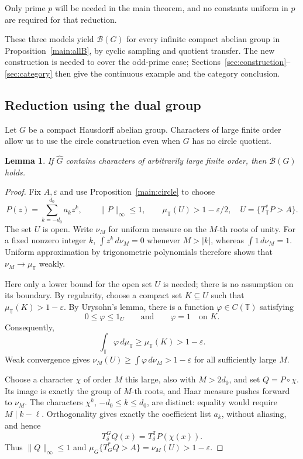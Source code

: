 \documentclass[11pt]{amsart}
\newtheorem{lemma}[theorem]{Lemma}
\theoremstyle{definition}
\theoremstyle{remark}
\newcommand{\B}{\mathcal B}
\begin{document}
Only prime \(p\) will be needed in the main theorem, and no
constants uniform in \(p\) are required for that reduction.

These three models yield \(\B(G)\) for every infinite compact
abelian group in Proposition~\ref{main:allB}, by cyclic sampling
and quotient transfer. The new construction is needed to cover the
odd-prime case; Sections~\ref{sec:construction}--\ref{sec:category} then give the continuous example
and the category conclusion.

\subsection{Reduction using the dual group}

Let $G$ be a compact Hausdorff abelian group. Characters of large finite order allow us to use the circle construction
even when \(G\) has no circle quotient.

\begin{lemma}\label{main:sampling}
If \(\widehat G\) contains characters of arbitrarily large finite
order, then \(\B(G)\) holds.
\end{lemma}

\begin{proof}
Fix \(A,\varepsilon\) and use Proposition~\ref{main:circle} to choose
\[
 P(z)=\sum_{k=-d_0}^{d_0} a_kz^k,\qquad \|P\|_\infty\leq1,\qquad
 \mu_{\mathbb T}(U)>1-\varepsilon/2,\quad U=\{T^*_{\mathbb T}P>A\}.
\]
The set \(U\) is open. Write \(\nu_M\) for uniform measure on
the \(M\)-th roots of unity. For a fixed nonzero integer \(k\),
\(\int z^k\,d\nu_M=0\) whenever \(M>|k|\), whereas
\(\int1\,d\nu_M=1\). Uniform approximation by trigonometric
polynomials therefore shows that \(\nu_M\to \mu_{\mathbb T}\) weakly.

Here only a lower bound for the open set \(U\) is needed;
there is no assumption on its boundary. By regularity, choose a compact
set \(K\subseteq U\) such that
\(\mu_{\mathbb T}(K)>1-\varepsilon\). By Urysohn's lemma, there is a
function \(\varphi\in C(\mathbb T)\) satisfying
\[
 0\leq\varphi\leq 1_U
 \qquad\text{and}\qquad
 \varphi=1\quad\text{on }K.
\]
Consequently,
\[
 \int_{\mathbb T}\varphi\,d\mu_{\mathbb T}
 \geq\mu_{\mathbb T}(K)>1-\varepsilon.
\]
Weak convergence gives
\(\nu_M(U)\geq\int\varphi\,d\nu_M>1-\varepsilon\) for all sufficiently
large \(M\).

Choose a character \(\chi\) of order \(M\) this large, also with
\(M>2d_0\), and set \(Q=P\circ\chi\).
Its image is exactly the group of \(M\)-th roots, and Haar measure
pushes forward to \(\nu_M\). The characters \(\chi^k\),
\(-d_0\leq k\leq d_0\), are distinct: equality would require
\(M\mid k-\ell\). Orthogonality gives exactly the coefficient
list \(a_k\), without aliasing, and hence
\[
 T_\delta^GQ(x)=T_\delta^{\mathbb T}P(\chi(x)).
\]
Thus \(\|Q\|_\infty\leq1\) and
\(\mu_G\{T^*_GQ>A\}=\nu_M(U)>1-\varepsilon\).
\end{proof}
\end{document}
